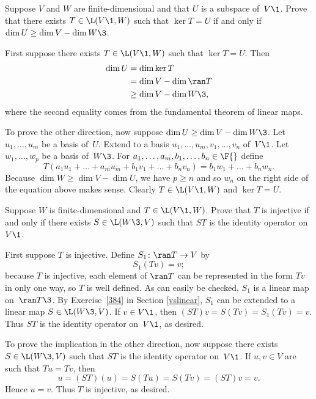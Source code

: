 \exercise
Suppose $V$ and $W$ are finite-dimensional and that
$U$ is a subspace of~$V\1$.
Prove that there exists $T \in \L(V\1,W)$ such that $\ker T = U$
if and only if $\dim U \ge \dim V - \dim W\3$.

\begin{Solution}
First suppose there exists $T \in \L(V\1,W)$ such that $\ker T = U$.
Then\begin{align*}
\dim U &= \dim \ker T \\
&= \dim V - \dim \ran T \\
&\ge \dim V - \dim W\3,
\end{align*}
where the second equality comes from the fundamental theorem of linear maps.

To prove the other direction, now suppose $\dim U \ge \dim V - \dim W\3$.  Let
$u_1, \dots, u_m$ be a basis of~$U$.  Extend to a basis
$u_1, \dots, u_m, v_1, \dots, v_n$ of~$V\1$.  Let $w_1, \dots, w_p$ be a basis
of~$W\3$.  For $a_1, \dots, a_m, b_1, \dots, b_n \in \F{}$ define
\[
T(a_1 u_1 + \dots + a_m u_m + b_1 v_1 + \dots + b_n v_n)
= b_1 w_1 + \dots + b_n w_n.
\]
Because $\dim W \ge \dim V - \dim U$, we have $p \ge n$ and so $w_n$ on the
right side of the equation above makes sense.  Clearly $T \in \L(V\1,W)$ and
$\ker T = U$.
\end{Solution}

\exercise
Suppose $W$ is finite-dimensional and $T \in \L(V\1,W)$.  Prove that $T$ is
injective if and only if there exists $S \in \L(W\3, V)$ such that $ST$ is the identity operator on~$V\1$.

\begin{Solution}
First suppose $T$ is injective.  Define
$S_1 \colon \ran T \to V$ by
\[
S_1(Tv) = v;
\]
because $T$ is injective, each element of $\ran T$ can be represented in the
form $Tv$ in only one way, so $T$ is well defined.  As can easily be checked,
$S_1$ is a linear map on~$\ran T\3$.  By Exercise~\ref{384} in Section \ref{vslinear}, $S_1$ can
be extended to a linear map $S\in \L(W\3, V)$.  If $v \in V\1$, then $(ST)v = S(Tv) =
S_1(Tv) = v$.  Thus $ST$ is the identity operator on~$V\1$, as desired.

To prove the implication in the other direction, now suppose there exists
$S \in \L(W\3, V)$ such that $ST$ is the identity operator on~$V\1$.  If $u, v \in V$ are such
that $Tu = Tv$, then
\[
u = (ST)(u) = S(Tu) = S(Tv) = (ST)v = v.
\]
Hence $u = v$.  Thus $T$ is injective, as desired.
\end{Solution}

